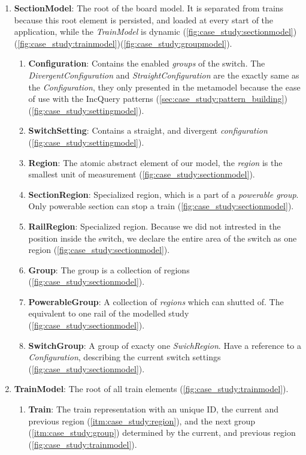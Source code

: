 \begin{enumerate}
	\item \textbf{SectionModel}: The root of the board model. It is separated from trains because this root element is persisted, and loaded at every start of the application, while the \emph{TrainModel} is dynamic (\cref{fig:case_study:sectionmodel})(\cref{fig:case_study:trainmodel})(\cref{fig:case_study:groupmodel}).
	\begin{enumerate}
		\item \textbf{Configuration}: Contains the enabled \emph{groups} of the switch. The \emph{DivergentConfiguration} and \emph{StraightConfiguration} are the exactly same as the \emph{Configuration}, they only presented in the metamodel because the ease of use with the IncQuery patterns (\cref{sec:case_study:pattern_building}) (\cref{fig:case_study:settingmodel}).
		\item \textbf{SwitchSetting}: Contains a straight, and divergent \emph{configuration} (\cref{fig:case_study:settingmodel}).
		\item \label{itm:case_study:region} \textbf{Region}: The atomic abstract element of our model, the \emph{region} is the smallest unit of measurement (\cref{fig:case_study:sectionmodel}).
		\item \textbf{SectionRegion}: Specialized region, which is a part of a \emph{powerable group}. Only powerable section can stop a train (\cref{fig:case_study:sectionmodel}). 
		\item \textbf{RailRegion}: Specialized region. Because we did not intrested in the position inside the switch, we declare the entire area of the switch as one region (\cref{fig:case_study:sectionmodel}).
		\item \label{itm:case_study:group} \textbf{Group}: The group is a collection of regions (\cref{fig:case_study:sectionmodel}).
		\item \textbf{PowerableGroup}: A collection of \emph{regions} which can shutted of. The equivalent to one rail of the modelled study (\cref{fig:case_study:sectionmodel}).
		\item \textbf{SwitchGroup}: A group of exacty one \emph{SwichRegion}. Have a reference to a \emph{Configuration}, describing the current switch settings (\cref{fig:case_study:sectionmodel}).
	\end{enumerate}
	\item \textbf{TrainModel}: The root of all train elements (\cref{fig:case_study:trainmodel}).
	\begin{enumerate}
		\item \textbf{Train}: The train representation with an unique ID, the current and previous region (\cref{itm:case_study:region}), and the next group (\cref{itm:case_study:group}) determined by the current, and previous region (\cref{fig:case_study:trainmodel}).
	\end{enumerate}
\end{enumerate}

